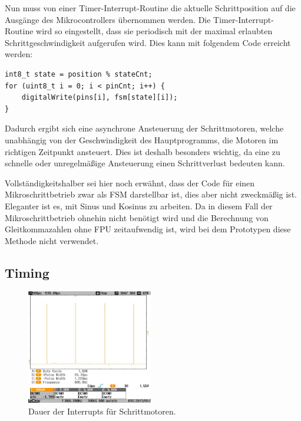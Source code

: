 Nun muss von einer Timer-Interrupt-Routine die aktuelle Schrittposition auf die Ausgänge des Mikrocontrollers übernommen werden.
Die Timer-Interrupt-Routine wird so eingestellt, dass sie periodisch mit der maximal erlaubten Schrittgeschwindigkeit aufgerufen wird.
Dies kann mit folgendem Code erreicht werden:

\begin{minipage}{\textwidth}
\begin{lstlisting}
int8_t state = position % stateCnt;
for (uint8_t i = 0; i < pinCnt; i++) {
	digitalWrite(pins[i], fsm[state][i]);
}
\end{lstlisting}
\end{minipage}

Dadurch ergibt sich eine asynchrone Ansteuerung der Schrittmotoren, welche unabhängig von der Geschwindigkeit des Hauptprogramms, die Motoren im richtigen Zeitpunkt ansteuert.
Dies ist deshalb besonders wichtig, da eine zu schnelle oder unregelmäßige Ansteuerung einen Schrittverlust bedeuten kann.

Vollständigkeitshalber sei hier noch erwähnt, dass der Code für einen Mikroschrittbetrieb zwar als FSM darstellbar ist, dies aber nicht zweckmäßig ist.
Eleganter ist es, mit Sinus und Kosinus zu arbeiten.
Da in diesem Fall der Mikroschrittbetrieb ohnehin nicht benötigt wird und die Berechnung von Gleitkommazahlen ohne FPU zeitaufwendig ist, wird bei dem Prototypen diese Methode nicht verwendet.

\subsection{Timing}

\begin{figure} \centering
	\includegraphics[width=0.49\textwidth]{img/PicturesPlots/Timing/StepperLaserPositioner/COPY/CONVERT/SCRN0154_Cutted.jpg}
	\caption{Dauer der Interrupts für Schrittmotoren.}
	\label{fig:interruptStepper}
\end{figure}

